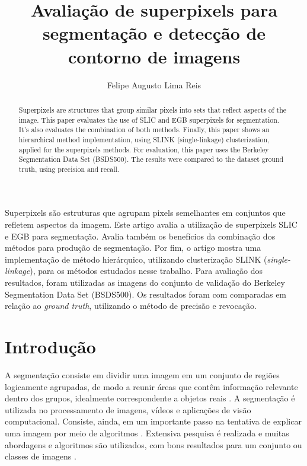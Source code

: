 \title{Avaliação de superpixels para segmentação e detecção de contorno de imagens}
\author{Felipe Augusto Lima Reis\inst{1}}
\begin{document}
 

\maketitle

\begin{abstract}
  Superpixels are structures that group similar pixels into sets that reflect aspects of the image. This paper evaluates the use of SLIC and EGB superpixels for segmentation. It's also evaluates the combination of both methods. Finally, this paper shows an hierarchical method implementation, using SLINK (single-linkage) clusterization, applied for the superpixels methods. For evaluation, this paper uses the Berkeley Segmentation Data Set (BSDS500). The results were compared to the dataset ground truth, using precision and recall.
\end{abstract}
     
\begin{resumo} 
  Superpixels são estruturas que agrupam pixels semelhantes em conjuntos que refletem aspectos da imagem. Este artigo avalia a utilização de superpixels SLIC e EGB para segmentação. Avalia também os benefícios da combinação dos métodos para produção de segmentação. Por fim, o artigo mostra uma implementação de método hierárquico, utilizando clusterização SLINK (\textit{single-linkage}), para os métodos estudados nesse trabalho. Para avaliação dos resultados, foram utilizadas as imagens do conjunto de validação do Berkeley Segmentation Data Set (BSDS500). Os resultados foram com comparadas em relação ao \textit{ground truth}, utilizando o método de precisão e revocação.
\end{resumo}


\section{Introdução} \label{sec:introducao}

A segmentação consiste em dividir uma imagem em um conjunto de regiões logicamente agrupadas, de modo a reunir áreas que contêm informação relevante dentro dos grupos, idealmente correspondente a objetos reais \cite{DOMINGUEZ} \cite{ZHANG2008}. A segmentação é utilizada no processamento de imagens, vídeos e aplicações de visão computacional. Consiste, ainda, em um importante passo na tentativa de explicar uma imagem por meio de algoritmos \cite{ZHANG2008}. Extensiva pesquisa é realizada e muitas abordagens e algoritmos são utilizados, com bons resultados para um conjunto ou classes de imagens \cite{ZHANG2008}. 
\end{document}
